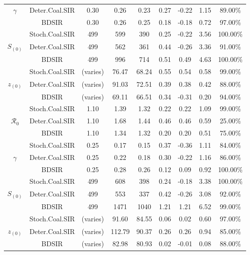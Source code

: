 \documentclass[12pt,titlepage]{article}
\newcommand{\BDSIR}{BDSIR}
\begin{document}
\begin{table}[!ht]
\begin{center}
\begin{tabular}{|c|c|c|c|c|c|c|c|c|}
$\gamma$ & Deter.Coal.SIR  & 0.30 & 0.26 & 0.23 & 0.27 & -0.22 & 1.15 & 89.00\% \\
& \BDSIR{} & 0.30 & 0.26 & 0.25 & 0.18 & -0.18 & 0.72 & 97.00\% \\ 
   \hline
   \hline
& Stoch.Coal.SIR & 499 & 599 & 390 & 0.25 & -0.22 & 3.56 & 100.00\% \\
$S_{(0)}$ & Deter.Coal.SIR & 499 & 562 & 361 & 0.44 & -0.26 & 3.36 & 91.00\% \\
& \BDSIR{} & 499 & 996 & 714 & 0.51 & 0.49 & 4.63 & 100.00\% \\ 
   \hline
   \hline
& Stoch.Coal.SIR & (varies) & 76.47 & 68.24 & 0.55 & 0.54 & 0.58 & 99.00\% \\
$z_{(0)}$ & Deter.Coal.SIR & (varies) & 91.03 & 72.51 & 0.39 & 0.38 & 0.42 & 88.00\% \\
& \BDSIR{} & (varies) & 69.11 & 66.51 & 0.34 & -0.31 & 0.20 & 94.00\% \\  
    \hline
	\hline
	\hline
	\hline
 & Stoch.Coal.SIR & 1.10 & 1.39 & 1.32 & 0.22 & 0.22 & 1.09 & 99.00\% \\
$\mathcal{R}_0$ & Deter.Coal.SIR & 1.10 & 1.68 & 1.44 & 0.46 & 0.46 & 0.59 & 25.00\% \\
 & BDSIR & 1.10 & 1.34 & 1.32 & 0.20 & 0.20 & 0.51 & 75.00\% \\
   \hline
   \hline 
 & Stoch.Coal.SIR & 0.25 & 0.17 & 0.15 & 0.37 & -0.36 & 1.11 & 84.00\% \\
$\gamma$ & Deter.Coal.SIR & 0.25 & 0.22 & 0.18 & 0.30 & -0.22 & 1.16 & 86.00\% \\
 & BDSIR & 0.25 & 0.28 & 0.26 & 0.12 & 0.09 & 0.92 & 100.00\% \\
   \hline
   \hline
 & Stoch.Coal.SIR & 499 & 608 & 398 & 0.24 & -0.18 & 3.38 & 100.00\% \\
$S_{(0)}$ & Deter.Coal.SIR & 499 & 553 & 337 & 0.42 & -0.26 & 3.08 & 92.00\% \\
 & BDSIR & 499 & 1471 & 1040 & 1.21 & 1.21 & 6.52 & 99.00\% \\
   \hline
   \hline
 & Stoch.Coal.SIR & (varies) & 91.60 & 84.55 & 0.06 & 0.02 & 0.60 & 97.00\% \\
$z_{(0)}$ & Deter.Coal.SIR & (varies) & 112.79 & 90.37 & 0.26 & 0.26 & 0.94 & 85.00\% \\
 & BDSIR & (varies) & 82.98 & 80.93 & 0.02 & -0.01 & 0.08 & 88.00\% \\
   \hline
\end{tabular}
\end{center}
{}
\label{table:sim}
\end{table}
\end{document}
